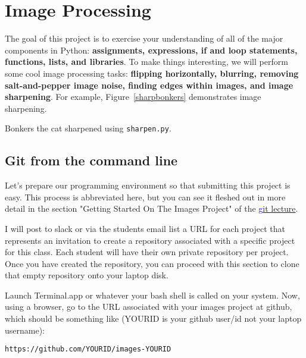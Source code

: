 \documentclass[titlepage]{tufte-book}
\newcounter{problem}
\newcommand{\figref}[1]{Figure~\ref{#1}}
\begin{document}
\chapter{Image Processing}

\setcounter{problem}{1}

\noindent The goal of this project is to exercise your understanding of all of the major components in Python: {\bf assignments, expressions, if and loop statements, functions, lists, and libraries}. To make things interesting, we will perform some cool image processing tasks: {\bf flipping horizontally, blurring, removing salt-and-pepper image noise, finding edges within images, and image sharpening}.  For example, \figref{sharpbonkers} demonstrates image sharpening.

\begin{marginfigure}
\begin{center}
\end{center}
\caption{Bonkers the cat sharpened using {\tt sharpen.py}.}
\label{sharpbonkers}
\end{marginfigure}

\section{Git from the command line}

Let's prepare our programming environment so that submitting this project is easy.  This process is abbreviated here, but you can see it fleshed out in more detail in the section "Getting Started On The Images Project" of the \href{https://github.com/parrt/msan501/blob/master/notes/git.md}{\textcolor{blue}git lecture}.

I will post to slack or via the students email list a URL for each project that represents an invitation to create a repository associated with a specific project for this class. Each student will have their own private repository per project. Once you have created the repository, you can proceed with this section to clone that empty repository onto your laptop disk.

Launch Terminal.app or whatever your bash shell is called on your system. Now, using a browser, go to the URL associated with your images project at github, which should be something like (YOURID is your github user/id not your laptop username): 

{\tt https://github.com/YOURID/images-YOURID}
\end{document}
